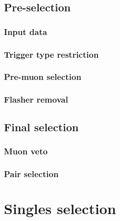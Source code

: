 \documentclass[../thesis.tex]{subfiles}
\begin{document}
\subsection{Pre-selection}
\label{sec:selPreSel}

\subsubsection{Input data}
\label{sec:selInputData}

\subsubsection{Trigger type restriction}
\label{sec:selTrigType}

\subsubsection{Pre-muon selection}
\label{sec:selPreMuons}

\subsubsection{Flasher removal}
\label{sec:selFlashers}

\subsection{Final selection}
\label{sec:selFinalSel}

\subsubsection{Muon veto}
\label{sec:selMuonVeto}

\subsubsection{Pair selection}
\label{sec:pairSel}

\section{Singles selection}
\label{sec:selSingles}
\end{document}
